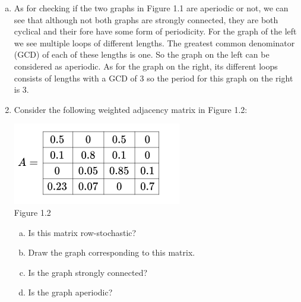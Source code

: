 \documentclass[11pt]{article}
\begin{document}
{\begin{enumerate}
\begin{enumerate}[(a)]
		\item As for checking if the two graphs in Figure 1.1 are aperiodic or not, we can see that although not both graphs are strongly connected, they are both cyclical and their fore have some form of periodicity.  For the graph of the left we see multiple loops of different lengths.  The greatest common denominator (GCD) of each of these lengths is one. So the graph on the left can be considered as aperiodic.  As for the graph on the right, its different loops consists of lengths with a GCD of 3 so the period for this graph on the right is 3.
	\end{enumerate}
\end{enumerate}
}

\begin{enumerate}
	\setcounter{enumi}{1}
	\item Consider the following weighted adjacency matrix in Figure 1.2:
	\begin{center}
		\includegraphics[scale=0.6]{Question2_Figure1.2}\\
		Figure 1.2
	\end{center}
	\begin{enumerate}[(a)]
		\item Is this matrix row-stochastic?
		\item Draw the graph corresponding to this matrix.
		\item Is the graph strongly connected?
		\item Is the graph aperiodic?
	\end{enumerate}
\end{enumerate}
\end{document}
